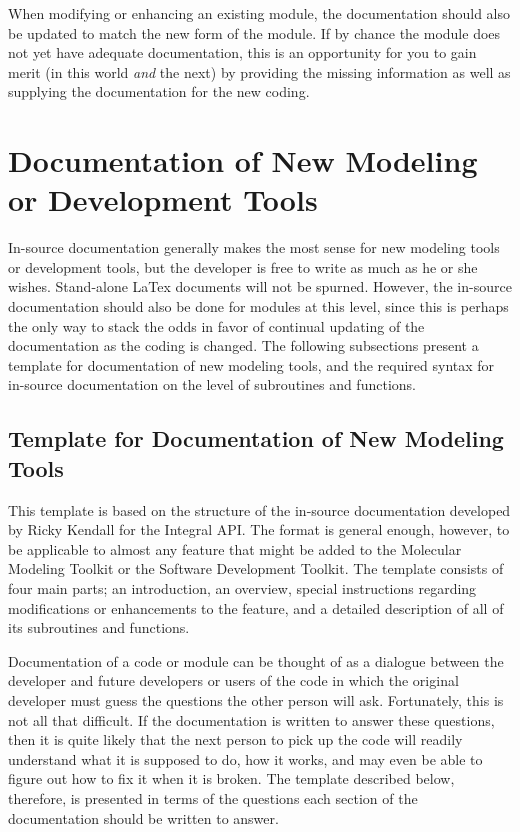 When modifying or enhancing an existing module, the documentation should also be
updated to match the new form of the module.  If by chance the module does not
yet have adequate documentation, 
this is an opportunity for you to gain merit (in this world
{\em and} the next) by providing the missing information as well as supplying the
documentation for the new coding.

\section{Documentation of New Modeling or Development Tools}

In-source documentation generally makes the most sense for new modeling tools
or development tools, but the developer is free to write as much as he or she
wishes.  Stand-alone LaTex documents will not be spurned.  However, the
in-source documentation should also be done for modules at this level, since
this is perhaps the only way to stack the odds in favor of continual updating
of the documentation as the coding is changed.  The following subsections
present a template for documentation of new modeling tools, and the
required syntax for in-source documentation on the level of subroutines and
functions.

\subsection{Template for Documentation of New Modeling Tools}

This template is based on the structure of the in-source documentation
developed by Ricky Kendall for the Integral API.  The format
is general enough, however, to be applicable to almost any 
feature that might be added to the Molecular Modeling Toolkit or
the Software Development Toolkit.  The template consists of four main parts; 
an introduction, an overview, special instructions regarding modifications
or enhancements to the feature, and a detailed description of all of
its subroutines
and functions.  


Documentation of a code or module can be thought of as a dialogue between the
developer and future developers or users of the code in which the original developer
must guess the questions the other person will ask.  Fortunately, this is 
not all that difficult.  If the documentation is written to answer these 
questions, then it is quite likely that the next person to pick up the
code will readily understand what it is supposed to do, how it works, and
may even be able to figure out how to fix it when it is broken.  The template
described below, therefore, is presented in terms of the questions each
section of the documentation should be written to answer.


